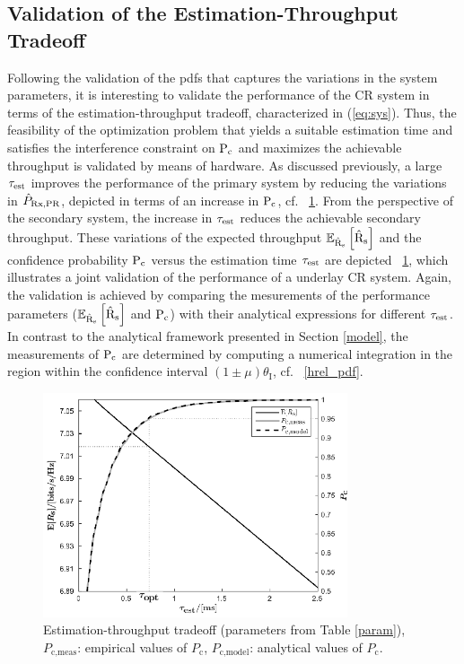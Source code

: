 \subsection{Validation of the Estimation-Throughput Tradeoff}
Following the validation of the pdfs that captures the variations in the system parameters, it is interesting to validate the performance of the CR system in terms of the estimation-throughput tradeoff, characterized in (\ref{eq:sys}). Thus, the feasibility of the optimization problem that yields a suitable estimation time and satisfies the interference constraint on $\text{P}_{\text{c}}$ and maximizes the achievable throughput is validated by means of hardware. As discussed previously, a large $\tau_{\text{est}}$ improves the performance of the primary system by reducing the variations in $\hat{P}_{\text{Rx,PR}}$, depicted in terms of an increase in $\text{P}_{\text{c}}$, cf. \figurename~\ref{RspocstricheA}. From the perspective of the secondary system, the increase in $\tau_{\text{est}}$ reduces the achievable secondary throughput. These variations of the expected throughput ${\mathbb E}_{\hat{\text{{R}}}_{\text{s}}}\left[ \hat{\text{{R}}}_{\text{s}} \right]$ and the confidence probability $\text{P}_{\text{c}}$ versus the estimation time $\tau_{\text{est}}$ are depicted \figurename~\ref{RspocstricheA}, which illustrates a joint validation of the performance of a underlay CR system. Again, the validation is achieved by comparing the mesurements of the performance parameters (${\mathbb E}_{\hat{\text{{R}}}_{\text{s}}}\left[ \hat{\text{{R}}}_{\text{s}} \right]$ and $\text{P}_{\text{c}}$) with their analytical expressions for different $\tau_{\text{est}}$. In contrast to the analytical framework presented in Section \ref{model}, the measurements of $\text{P}_{\text{c}}$ are determined by computing a numerical integration in the region within the confidence interval $(1  \pm \mu)  \theta_\textrm{I}$, cf. \figurename~\ref{hrel_pdf}. 
\begin{figure}
	\centering
	\includegraphics[width=0.8\textwidth]{figures/Rs_poc_striche}
	\caption{Estimation-throughput tradeoff (parameters from Table \ref{param}), $P_\textrm{c,meas}$: empirical values of $P_\textrm{c}$, $P_\textrm{c,model}$: analytical values of $P_\textrm{c}$.}
	\label{RspocstricheA}
\end{figure}


